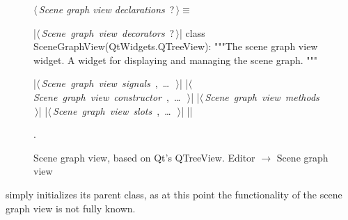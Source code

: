 \documentclass[%
    a4paper,    %
    justified,  %
    nobib,      %
    openany     %
]{tufte-book}
\begin{document}
\begin{figure}
\begin{flushleft} \small
\begin{minipage}{\linewidth}\label{scrap40}\raggedright\small
{} $\langle\,${\itshape Scene graph view declarations}\nobreak\ {\footnotesize {?}}$\,\rangle\equiv$
\vspace{-1ex}
\begin{pythoncode}
|\hbox{$\langle\,${\itshape Scene graph view decorators}\nobreak\ {\footnotesize ?}$\,\rangle$}|
class SceneGraphView(QtWidgets.QTreeView):
    """The scene graph view widget.
    A widget for displaying and managing the scene graph.
    """

    |\hbox{$\langle\,${\itshape Scene graph view signals}\nobreak\ {\footnotesize {}, \ldots\ }$\,\rangle$}|
    |\hbox{$\langle\,${\itshape Scene graph view constructor}\nobreak\ {\footnotesize {}, \ldots\ }$\,\rangle$}|
    |\hbox{$\langle\,${\itshape Scene graph view methods}\nobreak\ {\footnotesize {}}$\,\rangle$}|
    |\hbox{$\langle\,${\itshape Scene graph view slots}\nobreak\ {\footnotesize {}, \ldots\ }$\,\rangle$}|
|\NWsep|
\end{pythoncode}
\vspace{1.5ex}
\footnotesize
\begin{list}{}{\setlength{\itemsep}{-\parsep}\setlength{\itemindent}{-\leftmargin}}
\item {\NWtxtMacroNoRef}.

\item{}
\end{list}
\end{minipage}\vspace{4ex}
\end{flushleft}
\caption{Scene graph view, based on Qt's QTreeView.
  \newline{}\newline{}Editor $\rightarrow$ Scene graph view}
\label{editor:lst:scene-graph-view}
\end{figure}

 simply initializes its parent class, as at this
point the functionality of the scene graph view is not fully known.
\end{document}
